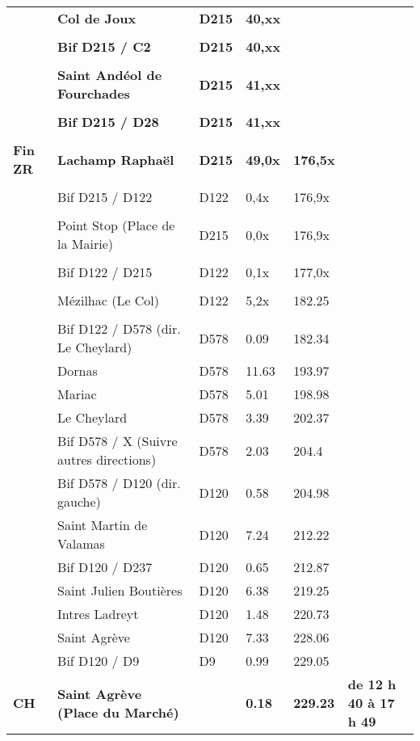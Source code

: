 \documentclass{article}%
\begin{document}
\begin{longtable}{p{2.25cm}|p{7.0cm}|p{1.5cm}|p{1.5cm}|p{1.5cm}|p{3.5cm}}
 &\textbf{Col de Joux }&\textbf{D215}&\textbf{40,xx}& & \\%
 & & & & & \\%
 &\textbf{Bif D215 / C2 }&\textbf{D215}&\textbf{40,xx}& & \\%
 & & & & & \\%
 &\textbf{Saint Andéol de Fourchades}&\textbf{D215}&\textbf{41,xx}& & \\%
 & & & & & \\%
 &\textbf{Bif D215 / D28}&\textbf{D215}&\textbf{41,xx}& & \\%
 & & & & & \\%
\textbf{Fin ZR}&\textbf{Lachamp Raphaël}&\textbf{D215}&\textbf{49,0x}&\textbf{176,5x}& \\%
 & & & & & \\%
 &Bif D215 / D122&D122&0,4x&176,9x& \\%
 & & & & & \\%
 &Point Stop (Place de la Mairie)&D215&0,0x&176,9x& \\%
 & & & & & \\%
 &Bif  D122 / D215&D122&0,1x&177,0x& \\%
 & & & & & \\%
 &Mézilhac (Le Col)&D122&5,2x&182.25& \\%
 & & & & & \\%
 &Bif D122 / D578 (dir. Le Cheylard)&D578&0.09&182.34& \\%
 &Dornas&D578 &11.63&193.97& \\%
 &Mariac&D578 &5.01&198.98& \\%
 &Le Cheylard&D578 &3.39&202.37& \\%
 &Bif D578 / X (Suivre autres directions)&D578 &2.03&204.4& \\%
 &Bif D578 / D120 (dir. gauche)&D120&0.58&204.98& \\%
 &Saint Martin de Valamas&D120&7.24&212.22& \\%
 &Bif D120 / D237&D120&0.65&212.87& \\%
 &Saint Julien Boutières&D120&6.38&219.25& \\%
 &Intres Ladreyt&D120&1.48&220.73& \\%
 &Saint Agrève&D120&7.33&228.06& \\%
 &Bif D120 / D9&D9&0.99&229.05& \\%
\textbf{CH}&\textbf{Saint Agrève (Place du Marché)}& &\textbf{0.18}&\textbf{229.23}&\textbf{de 12 h 40 à 17 h 49}\\%
\hline%
\end{longtable}%
\end{document}
